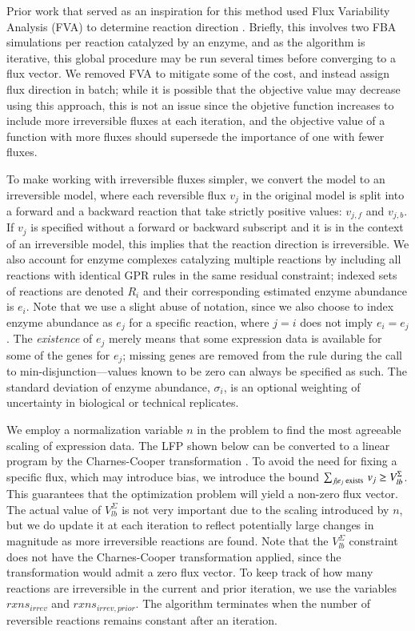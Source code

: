 Prior work that served as an inspiration for this method used Flux
Variability Analysis (FVA) to determine reaction direction
\citep{Lee2012}. Briefly, this involves two FBA simulations per
reaction catalyzed by an enzyme, and as the algorithm is iterative,
this global procedure may be run several times before converging to a
flux vector.  We removed FVA to mitigate some
of the cost, and instead assign flux direction in batch; while it is
possible that the objective value may decrease using this approach,
this is not an issue since the objetive function increases to include
more irreversible fluxes at each iteration, and the objective value of
a function with more fluxes should supersede the importance of one
with fewer fluxes.
 
To make working with irreversible fluxes simpler, we convert the model
to an irreversible model, where each reversible flux $v_j$ in the
original model is split into a forward and a backward reaction that take
strictly positive values: $v_{j,f}$ and $v_{j,b}$. If $v_j$ is
specified without a forward or backward subscript and it is in the
context of an irreversible model, this implies that the reaction
direction is irreversible. We also account for enzyme complexes
catalyzing multiple reactions by including all reactions with identical
GPR rules in the same residual
constraint; indexed sets of reactions are denoted $R_i$ and their
corresponding estimated enzyme abundance is $e_i$. Note that we use a
slight abuse of notation, since we also choose to index enzyme
abundance as $e_j$ for a specific reaction, where $j = i$ does not
imply $e_i = e_j$. The \emph{existence} of $e_j$ merely means that
some expression data is available for some of the genes for $e_j$;
missing genes are removed from the rule during the call to
min-disjunction---values known to be zero can always be specified as
such. The standard deviation of enzyme abundance, $\sigma_i$, is an
optional weighting of uncertainty in biological or technical
replicates.

We employ a normalization variable $n$ in the problem to find the most
agreeable scaling of expression data. The LFP shown below can be
converted to a linear program by the Charnes-Cooper transformation
\citep{Boyd2004}. To avoid the need for fixing a specific flux, which
may introduce bias, we introduce the bound $\sum_{j \mid e_j 
\textnormal{ exists }} v_j \geq V_{lb}^{\Sigma}$. This guarantees that
the optimization problem will yield a non-zero flux vector. The actual
value of $V_{lb}^{\Sigma}$ is not very important due to the scaling
introduced by $n$, but we do update it at each iteration to reflect
potentially large changes in magnitude as more irreversible reactions
are found. Note that the $V_{lb}^{\Sigma}$ constraint does not have
the Charnes-Cooper transformation applied, since the transformation
would admit a zero flux vector. To keep track of how many reactions
are irreversible in the
current and prior iteration, we use the variables $rxns_{irrev}$ and
$rxns_{irrev,prior}$. The algorithm terminates when the number of
reversible reactions remains constant after an iteration.

